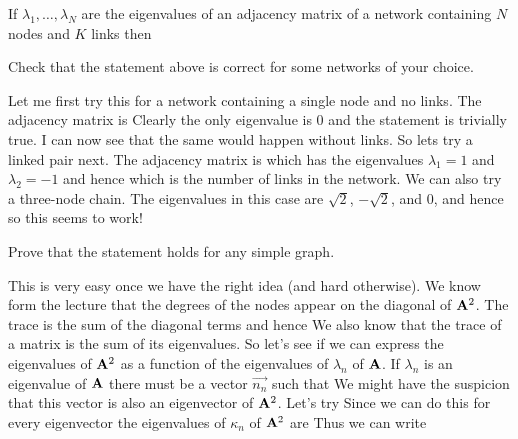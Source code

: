 
If $\lambda_1,\ldots,\lambda_N$ are the eigenvalues of an adjacency matrix of a network containing $N$ nodes and $K$ links then 

\subquestion
Check that the statement above is correct for some networks of your choice. 

\solution
Let me first try this for a network containing a single node and no links. The adjacency matrix is 
Clearly the only eigenvalue is 0 and the statement is trivially true. I can now see that the same would happen without links. So lets try a linked pair next. The adjacency matrix is 
which has the eigenvalues $\lambda_1=1$ and $\lambda_2=-1$ and hence 
which is the number of links in the network. We can also try a three-node chain. The eigenvalues in this case are $\sqrt{2}$, $-\sqrt{2}$, and $0$, and hence
so this seems to work!

\subquestion 
Prove that the statement holds for any simple graph. 

\solution
This is very easy once we have the right idea (and hard otherwise). We know form the lecture that the degrees of the nodes appear on the diagonal of ${\bf A}^2$. The trace is the sum of the diagonal terms and hence 
We also know that the trace of a matrix is the sum of its eigenvalues. So let's see if we can express the eigenvalues of ${\bf A}^2$ as a function of the eigenvalues of $\lambda_n$ of $\bf A$. If $\lambda_n$ is an eigenvalue of $\bf A$ there must be a vector $\vec{n_n}$ such that 
We might have the suspicion that this vector is also an eigenvector of ${\bf A}^2$. Let's try 
Since we can do this for every eigenvector the eigenvalues of $\kappa_n$ of ${\bf A}^2$ are
Thus we can write
